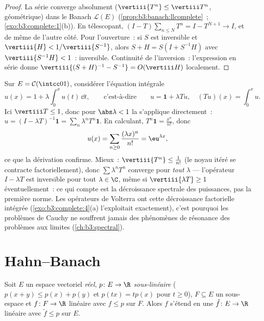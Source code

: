 \begin{proof}
La série converge absolument ($\vertiii{T^n} \leq \vertiii
T^n$, géométrique) dans le Banach $\mathcal L(E)$
(\cref{prop:b3:banach:llcomplete}~;
\cref{exo:b3:complete:1}(b)). En télescopant, $(I -
T)\sum_{n \leq N}T^n = I - T^{N+1} \to I$, et de même de
l'autre côté. Pour l'ouverture~: si $S$ est inversible et
$\vertiii{H} < 1/\vertiii{S^{-1}}$, alors $S + H = S(I +
S^{-1}H)$ avec $\vertiii{S^{-1}H} < 1$~: inversible.
Continuité de l'inversion~: l'expression en série donne
$\vertiii{(S+H)^{-1} - S^{-1}} = O(\vertiii H)$ localement.
\end{proof}

\begin{example}
\label{ex:b3:banach:volterraexample}
Sur $E = \mathcal C(\intcc01)$, considérer l'équation
intégrale
\[
u(x) = 1 + \lambda\int_0^xu(t)\,\dd t,
\qquad\text{c'est-à-dire}\qquad u = \mathbf 1 + \lambda Tu,
\quad (Tu)(x) = \int_0^xu .
\]
Ici $\vertiii T \leq 1$, donc pour $\abs\lambda < 1$ la  s'applique directement~: $u = (I - \lambda
T)^{-1}\mathbf 1 = \sum_n\lambda^nT^n\mathbf 1$. En calculant,
$T^n\mathbf 1 = \frac{x^n}{n!}$, donc
\[
u(x) = \sum_{n\geq0}\frac{(\lambda x)^n}{n!} =
\eu^{\lambda x} ,
\]
ce que la dérivation confirme. Mieux~: $\vertiii{T^n} \leq
\frac1{n!}$ (le noyau itéré se contracte factoriellement),
donc $\sum\lambda^nT^n$ converge pour \emph{tout} $\lambda$
--- l'opérateur $I - \lambda T$ est inversible pour tout
$\lambda \in \C$, même si $\vertiii{\lambda T} \geq 1$
éventuellement~: ce qui compte est la décroissance spectrale
des puissances, pas la première norme. Les opérateurs de
Volterra ont cette décroissance factorielle intégrée
(\cref{exo:b3:complete:4}(a) l'exploitait exactement), c'est
pourquoi les problèmes de Cauchy ne souffrent jamais des
phénomènes de résonance des problèmes aux limites
(\cref{ch:b3:spectral}).
\end{example}

\section{Hahn--Banach}

\begin{theorem}
\label{thm:b3:banach:hahnbanach}
Soit $E$ un espace vectoriel \emph{réel}, $p \colon E \to \R$
\emph{sous-linéaire} ($p(x + y) \leq p(x) + p(y)$ et $p(tx) =
tp(x)$ pour $t \geq 0$), $F \subseteq E$ un sous-espace et $f
\colon F \to \R$ linéaire avec $f \leq p$ sur $F$. Alors $f$
s'étend en une $\tilde f \colon E \to \R$ linéaire avec
$\tilde f \leq p$ sur $E$.
\end{theorem}

